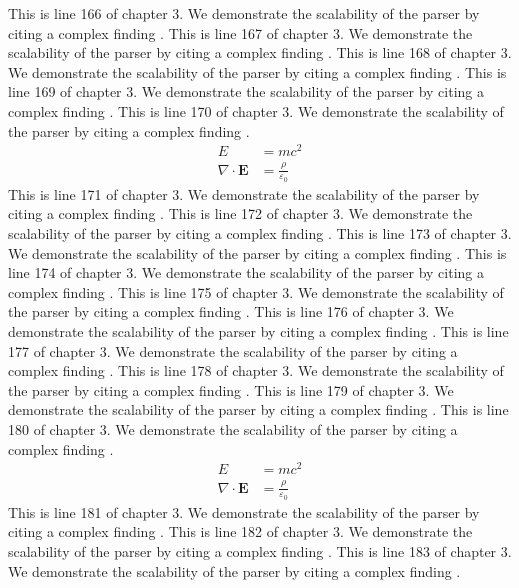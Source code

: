 This is line 166 of chapter 3. We demonstrate the scalability of the parser by citing a complex finding \cite{ref3_166}.
This is line 167 of chapter 3. We demonstrate the scalability of the parser by citing a complex finding \cite{ref3_167}.
This is line 168 of chapter 3. We demonstrate the scalability of the parser by citing a complex finding \cite{ref3_168}.
This is line 169 of chapter 3. We demonstrate the scalability of the parser by citing a complex finding \cite{ref3_169}.
This is line 170 of chapter 3. We demonstrate the scalability of the parser by citing a complex finding \cite{ref3_170}.
\begin{align*}
  E &= mc^2 \\
  \nabla \cdot \mathbf{E} &= \frac{\rho}{\varepsilon_0}
\end{align*}
This is line 171 of chapter 3. We demonstrate the scalability of the parser by citing a complex finding \cite{ref3_171}.
This is line 172 of chapter 3. We demonstrate the scalability of the parser by citing a complex finding \cite{ref3_172}.
This is line 173 of chapter 3. We demonstrate the scalability of the parser by citing a complex finding \cite{ref3_173}.
This is line 174 of chapter 3. We demonstrate the scalability of the parser by citing a complex finding \cite{ref3_174}.
This is line 175 of chapter 3. We demonstrate the scalability of the parser by citing a complex finding \cite{ref3_175}.
This is line 176 of chapter 3. We demonstrate the scalability of the parser by citing a complex finding \cite{ref3_176}.
This is line 177 of chapter 3. We demonstrate the scalability of the parser by citing a complex finding \cite{ref3_177}.
This is line 178 of chapter 3. We demonstrate the scalability of the parser by citing a complex finding \cite{ref3_178}.
This is line 179 of chapter 3. We demonstrate the scalability of the parser by citing a complex finding \cite{ref3_179}.
This is line 180 of chapter 3. We demonstrate the scalability of the parser by citing a complex finding \cite{ref3_180}.
\begin{align*}
  E &= mc^2 \\
  \nabla \cdot \mathbf{E} &= \frac{\rho}{\varepsilon_0}
\end{align*}
This is line 181 of chapter 3. We demonstrate the scalability of the parser by citing a complex finding \cite{ref3_181}.
This is line 182 of chapter 3. We demonstrate the scalability of the parser by citing a complex finding \cite{ref3_182}.
This is line 183 of chapter 3. We demonstrate the scalability of the parser by citing a complex finding \cite{ref3_183}.
